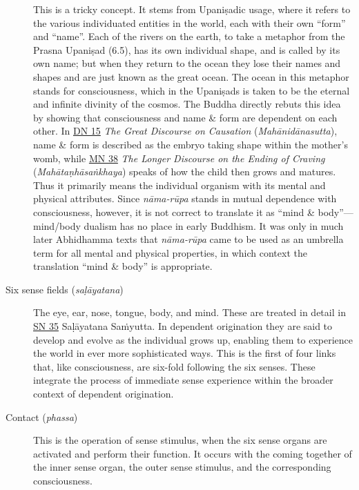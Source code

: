 \documentclass[12pt,openany]{book}%
\begin{document}
\begin{description}
This is a tricky concept. It stems from \textsanskrit{Upaniṣadic} usage, where it refers to the various individuated entities in the world, each with their own “form” and “name”. Each of the rivers on the earth, to take a metaphor from the Prasna \textsanskrit{Upaniṣad} (6.5), has its own individual shape, and is called by its own name; but when they return to the ocean they lose their names and shapes and are just known as the great ocean. The ocean in this metaphor stands for consciousness, which in the \textsanskrit{Upaniṣads} is taken to be the eternal and infinite divinity of the cosmos. The Buddha directly rebuts this idea by showing that consciousness and name \& form are dependent on each other. In \href{https://suttacentral.net/dn15}{DN 15} \textit{The Great Discourse on Causation} (\textit{\textsanskrit{Mahānidānasutta}}), name \& form is described as the embryo taking shape within the mother’s womb, while \href{https://suttacentral.net/mn38}{MN 38} \textit{The Longer Discourse on the Ending of Craving} (\textit{\textsanskrit{Mahātaṇhāsaṅkhaya}}) speaks of how the child then grows and matures. Thus it primarily means the individual organism with its mental and physical attributes. Since \textit{\textsanskrit{nāma}-\textsanskrit{rūpa}} stands in mutual dependence with consciousness, however, it is not correct to translate it as “mind \& body”—mind/body dualism has no place in early Buddhism. It was only in much later Abhidhamma texts that \textit{\textsanskrit{nāma}-\textsanskrit{rūpa}} came to be used as an umbrella term for all mental and physical properties, in which context the translation “mind \& body” is appropriate.%
\item[Six sense fields (\textit{\textsanskrit{saḷāyatana}})] The eye, ear, nose, tongue, body, and mind.
These are treated in detail in \href{https://suttacentral.net/sn35}{SN 35} \textsanskrit{Saḷāyatana} \textsanskrit{Saṁyutta}. In dependent origination they are said to develop and evolve as the individual grows up, enabling them to experience the world in ever more sophisticated ways. This is the first of four links that, like consciousness, are six-fold following the six senses. These integrate the process of immediate sense experience within the broader context of dependent origination.%
\item[Contact (\textit{phassa})] This is the operation of sense stimulus, when the six sense organs are activated and perform their function. It occurs with the coming together of the inner sense organ, the outer sense stimulus, and the corresponding consciousness.

\end{description}
\end{document}
